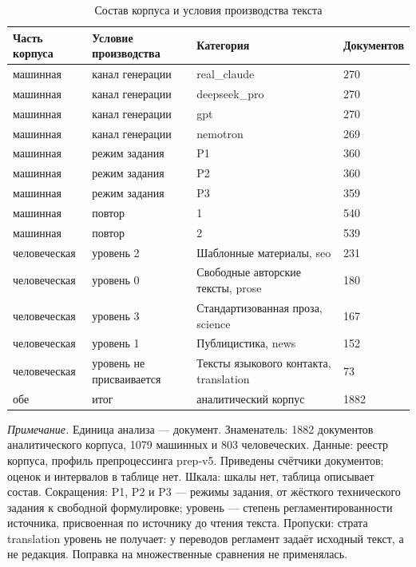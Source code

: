 \begin{table}[htbp]
\centering
\small
\caption{Состав корпуса и условия производства текста}
\label{tab:1}
\begin{tabular}{llll}
\toprule
Часть корпуса & Условие производства & Категория & Документов \\
\midrule
машинная & канал генерации & real\_claude & 270 \\
машинная & канал генерации & deepseek\_pro & 270 \\
машинная & канал генерации & gpt & 270 \\
машинная & канал генерации & nemotron & 269 \\
машинная & режим задания & P1 & 360 \\
машинная & режим задания & P2 & 360 \\
машинная & режим задания & P3 & 359 \\
машинная & повтор & 1 & 540 \\
машинная & повтор & 2 & 539 \\
человеческая & уровень 2 & Шаблонные материалы, seo & 231 \\
человеческая & уровень 0 & Свободные авторские тексты, prose & 180 \\
человеческая & уровень 3 & Стандартизованная проза, science & 167 \\
человеческая & уровень 1 & Публицистика, news & 152 \\
человеческая & уровень не присваивается & Тексты языкового контакта, translation & 73 \\
обе & итог & аналитический корпус & 1882 \\
\bottomrule
\end{tabular}
\begin{minipage}{\linewidth}\footnotesize\vspace{2pt}
\textit{Примечание.} Единица анализа — документ. Знаменатель: 1882 документов аналитического корпуса, 1079 машинных и 803 человеческих. Данные: реестр корпуса, профиль препроцессинга prep-v5. Приведены счётчики документов; оценок и интервалов в таблице нет. Шкала: шкалы нет, таблица описывает состав. Сокращения: P1, P2 и P3 — режимы задания, от жёсткого технического задания к свободной формулировке; уровень — степень регламентированности источника, присвоенная по источнику до чтения текста. Пропуски: страта translation уровень не получает: у переводов регламент задаёт исходный текст, а не редакция. Поправка на множественные сравнения не применялась.
\end{minipage}
\end{table}
